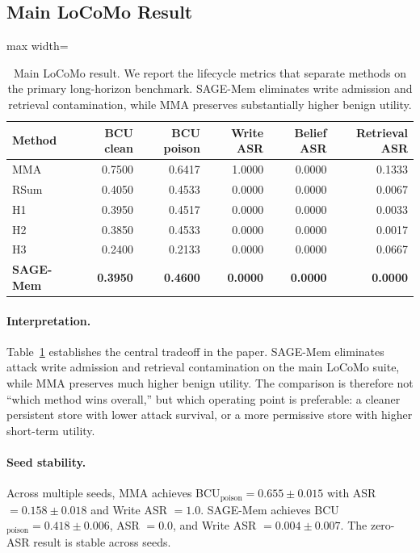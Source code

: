 \documentclass{article}
\begin{document}
\subsection{Main LoCoMo Result}

\begin{table}[t]
\centering
\small
\setlength{\tabcolsep}{4.2pt}
\renewcommand{\arraystretch}{0.96}
\begin{adjustbox}{max width=\columnwidth}
\begin{tabular}{lrrrrr}
\toprule
Method & BCU clean & BCU poison & Write ASR & Belief ASR & Retrieval ASR \\
\midrule
MMA & 0.7500 & 0.6417 & 1.0000 & 0.0000 & 0.1333 \\
RSum & 0.4050 & 0.4533 & 0.0000 & 0.0000 & 0.0067 \\
H1 & 0.3950 & 0.4517 & 0.0000 & 0.0000 & 0.0033 \\
H2 & 0.3850 & 0.4533 & 0.0000 & 0.0000 & 0.0017 \\
H3 & 0.2400 & 0.2133 & 0.0000 & 0.0000 & 0.0667 \\
\textbf{SAGE-Mem} & \textbf{0.3950} & \textbf{0.4600} & \textbf{0.0000} & \textbf{0.0000} & \textbf{0.0000} \\
\bottomrule
\end{tabular}
\end{adjustbox}
\caption{Main LoCoMo result. We report the lifecycle metrics that separate methods on the primary long-horizon benchmark. SAGE-Mem eliminates write admission and retrieval contamination, while MMA preserves substantially higher benign utility.}
\label{tab:locomo-main}
\end{table}


\paragraph{Interpretation.}
Table~\ref{tab:locomo-main} establishes the central tradeoff in the paper. SAGE-Mem eliminates attack write admission and retrieval contamination on the main LoCoMo suite, while MMA preserves much higher benign utility. The comparison is therefore not ``which method wins overall,'' but which operating point is preferable: a cleaner persistent store with lower attack survival, or a more permissive store with higher short-term utility.

\paragraph{Seed stability.}
Across multiple seeds, MMA achieves BCU$_\text{poison}=0.655 \pm 0.015$ with ASR $= 0.158 \pm 0.018$ and Write ASR $= 1.0$. SAGE-Mem achieves BCU$_\text{poison}=0.418 \pm 0.006$, ASR $= 0.0$, and Write ASR $= 0.004 \pm 0.007$. The zero-ASR result is stable across seeds.
\end{document}
